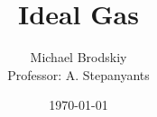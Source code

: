 


\title{Ideal Gas}
\date{\today}
\author{Michael Brodskiy\\ \small Professor: A. Stepanyants}



\maketitle

